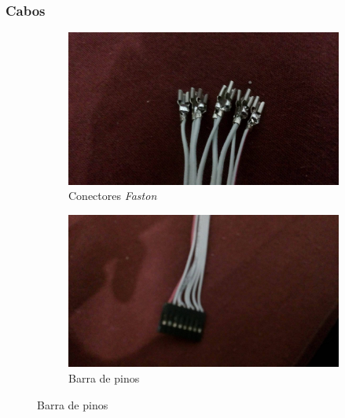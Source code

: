 \documentclass[hyperref={pdfpagelabels=false}]{beamer}
\begin{document}
                \begin{frame}\frametitle{Cabos}

                    \begin{figure}[H]
                        \centering
                        \begin{subfigure}[b]{.45\textwidth}
                            \centering
                            \includegraphics[scale=0.08]{Imagens/Zi02.jpg}
                        	\caption[Conectores \textit{Faston}]{Conectores \textit{Faston}}
                        	\label{fig:x002}
                        \end{subfigure} %
                        \begin{subfigure}[b]{.45\textwidth}
                            \centering
                        	\includegraphics[scale=0.08]{Imagens/Zi03.jpg}
                        	\caption[Barra de pinos]{Barra de pinos}
                        	\label{fig:backview}
                        \end{subfigure}

                        \label{fig:madeiratriplex}
                    \end{figure}

                \end{frame}
\end{document}
